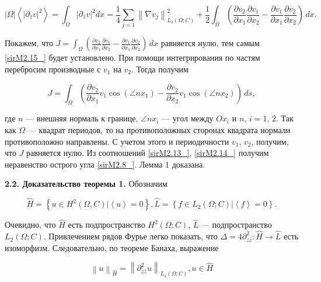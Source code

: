 \begin{equation*}
\left|\Omega \right|\left\langle \left|\partial _{\bar{z}} v\right|^{2} \right\rangle =\int _{\Omega }\left|\partial _{\bar{z}} v\right|^{2} dx=\frac{1}{4} \sum _{j=1}\left\| \nabla v_{j} \right\| _{L_{2} (\Omega ;C)}^{2}   +\frac{1}{2} \int _{\Omega }\left(\frac{\partial v_{2} }{\partial x_{1} } \frac{\partial v_{1} }{\partial x_{2} } -\frac{\partial v_{1} }{\partial x_{1} } \frac{\partial v_{2} }{\partial x_{2} } \right)\,  dx.
\end{equation*}

 Покажем, что  $J=\int _{\Omega }\left(\frac{\partial v_{2} }{\partial x_{1} } \frac{\partial v_{1} }{\partial x_{2} } -\frac{\partial v_{1} }{\partial x_{1} } \frac{\partial v_{2} }{\partial x_{2} } \right) \, dx$ равняется нулю,   тем самым \eqref{sirM2.15_} будет установлено. При помощи интегрирования по частям перебросим производные с $v_{1} $ на $v_{2} $. Тогда получим

\begin{equation*}
J=\int _{\Omega }\left(\frac{\partial v_{2} }{\partial x_{1} } v_{1} \cos (\angle nx_{1} )-\frac{\partial v_{2} }{\partial x_{2} } v_{1} \cos (\angle nx_{2} )\right) \, ds,
\end{equation*}

где $n$ --- внешняя нормаль к  границе, $\angle nx_{i} $  ---  угол между $Ox_{i} $ и $n$, $i=1,\, 2$. Так как $\Omega $ --- квадрат периодов, то на противоположных сторонах квадрата нормали противоположно направлены. С учетом этого и периодичности $v_{1} $, $v_{2} $, получим, что $J$ равняется нулю.  Из соотношений \eqref{sirM2.13_}, \eqref{sirM2.14_} получим неравенство острого угла \eqref{sirM2.8_}.   Лемма 1  доказана.

\textbf{2.2. Доказательство теоремы 1.} Обозначим

\begin{equation*}
\hat{H}=\left\{u\in H^{2} (\Omega ,C)|\left\langle u\right\rangle =0\right\},      \hat{L}=\left\{f\in L_{2} (\Omega ;C)|\left\langle f\right\rangle =0\right\}.
\end{equation*}

Очевидно, что $\hat{H}$ есть подпространство $H^{2} (\Omega ;C)$, $\hat{L}$ --- подпространство $L_{2} (\Omega ;C)$. Привлечением рядов Фурье легко показать, что $\Delta =4\partial _{z\bar{z}}^{2} :\hat{H}\to \hat{L}$ есть изоморфизм. Следовательно, по теореме Банаха,  выражение

\begin{equation*}
\left\| u\right\| _{\hat{H}} =\left\| \partial _{z\bar{z}}^{2} u\right\| _{L_{2} (\Omega ;C)} ,  u\in \hat{H}
\end{equation*}


